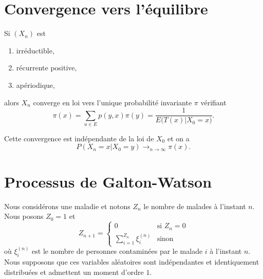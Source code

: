 \section{Convergence vers l'équilibre}


\begin{theorem}
	Si \( (X_n)\) est
	\begin{enumerate}
		\item
		      irréductible,
		\item
		      récurrente positive,
		\item
		      apériodique,
	\end{enumerate}
	alors \( X_n\) converge en loi vers l'unique probabilité invariante \( \pi\) vérifiant
	\begin{equation}
		\pi(x)=\sum_{u\in E}p(y,x)\pi(y)=\frac{1}{ E\big( T(x)|X_0=x \big) }.
	\end{equation}

	Cette convergence est indépendante de la loi de \( X_0\) et on a
	\begin{equation}
		P(X_n=x|X_0=y)\to_{n\to \infty} \pi(x).
	\end{equation}
\end{theorem}

\section{Processus de Galton-Watson}
\label{SecBPmrPdtGalton}

Nous considérons une maladie et notons \( Z_n\) le nombre de malades à l'instant \( n\). Nous posons \( Z_0=1\) et
\begin{equation}        \label{EqBvILKj}
	Z_{n+1}=\begin{cases}
		0                           & \text{si } Z_n=0 \\
		\sum_{i=1}^{Z_n}\xi_i^{(n)} & \text{sinon}
	\end{cases}
\end{equation}
où \( \xi_i^{(n)}\) est le nombre de personnes contaminées par le malade \(i\) à l'instant \( n\). Nous supposons que ces variables aléatoires sont indépendantes et identiquement distribuées et admettent un moment d'ordre \( 1\).

